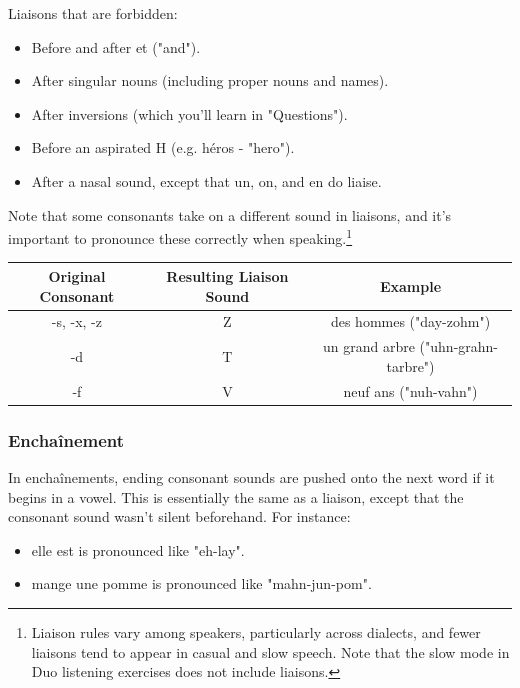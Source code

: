 Liaisons that are forbidden:

\begin{itemize}
  \item  Before and after et ("and").
  \item  After singular nouns (including proper nouns and names).
  \item  After inversions (which you'll learn in "Questions").
  \item  Before an aspirated H (e.g. héros - "hero").
  \item  After a nasal sound, except that un, on, and en do liaise.
\end{itemize}

Note that some consonants take on a different sound in liaisons, and it's important to pronounce these correctly when speaking.\footnote{Liaison rules vary among speakers, particularly across dialects, and fewer liaisons tend to appear in casual and slow speech. Note that the slow mode in Duo listening exercises does not include liaisons.}

\begin{center}\begin{tabular}{|c|c|c|}
\hline
\textbf{Original Consonant} & \textbf{Resulting Liaison Sound} & \textbf{Example}                    \\ \hline
-s, -x, -z                  & Z                                & des hommes ("day-zohm")             \\ \hline
-d                          & T                                & un grand arbre ("uhn-grahn-tarbre") \\ \hline
-f                          & V                                & neuf ans ("nuh-vahn")               \\ \hline
\end{tabular}\end{center}

\subsubsection{Encha{\^i}nement}

In encha{\^i}nements, ending consonant sounds are pushed onto the next word if it begins in a vowel. This is essentially the same as a liaison, except that the consonant sound wasn't silent beforehand. For instance:

\begin{itemize}
  \item  elle est is pronounced like "eh-lay".
  \item  mange une pomme is pronounced like "mahn-jun-pom".
\end{itemize}

